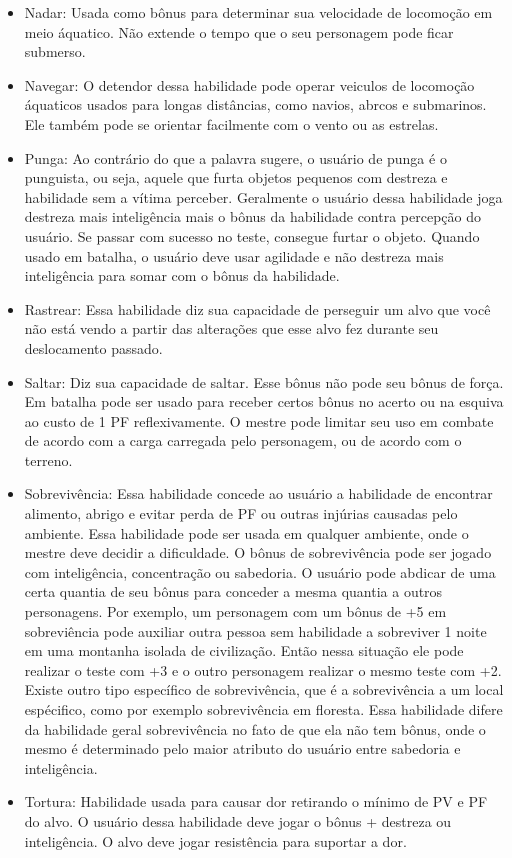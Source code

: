 \begin{itemize}
	\item Nadar: Usada como bônus para determinar sua velocidade de locomoção em meio áquatico. Não extende o tempo que o seu personagem pode ficar submerso.
	
	\item Navegar: O detendor dessa habilidade pode operar veiculos de locomoção áquaticos usados para longas distâncias, como navios, abrcos e submarinos. Ele também pode se orientar facilmente com o vento ou as estrelas.
	
	\item Punga: Ao contrário do que a palavra sugere, o usuário de punga é o punguista, ou seja, aquele que furta objetos pequenos com destreza e habilidade sem a vítima perceber. Geralmente o usuário dessa habilidade joga destreza mais inteligência mais o bônus da habilidade contra percepção do usuário. Se passar com sucesso no teste, consegue furtar o objeto. Quando usado em batalha, o usuário deve usar agilidade e não destreza mais inteligência para somar com o bônus da habilidade.  
	
	\item Rastrear: Essa habilidade diz sua capacidade de perseguir um alvo que você não está vendo a partir das alterações que esse alvo fez durante seu deslocamento passado.
	
	\item Saltar: Diz sua capacidade de saltar. Esse bônus não pode seu bônus de força. Em batalha pode ser usado para receber certos bônus no acerto ou na esquiva ao custo de 1 PF reflexivamente. O mestre pode limitar seu uso em combate de acordo com a carga carregada pelo personagem, ou de acordo com o terreno.
	
	\item Sobrevivência: Essa habilidade concede ao usuário a habilidade de encontrar alimento, abrigo e evitar perda de PF ou outras injúrias causadas pelo ambiente. Essa habilidade pode ser usada em qualquer ambiente, onde o mestre deve decidir a dificuldade. O bônus de sobrevivência pode ser jogado com inteligência, concentração ou sabedoria. O usuário pode abdicar de uma certa quantia de seu bônus para conceder a mesma quantia a outros personagens. Por exemplo, um personagem com um bônus de +5 em sobreviência pode auxiliar outra pessoa sem habilidade a sobreviver 1 noite em uma montanha isolada de civilização. Então nessa situação ele pode realizar o teste com +3 e o outro personagem realizar o mesmo teste com +2. Existe outro tipo específico de sobrevivência, que é a sobrevivência a um local espécifico, como por exemplo sobrevivência em floresta. Essa habilidade difere da habilidade geral sobrevivência no fato de que ela não tem bônus, onde o mesmo é determinado pelo maior atributo do usuário entre sabedoria e inteligência.
	
	\item Tortura: Habilidade usada para causar dor retirando o mínimo de PV e PF do alvo. O usuário dessa habilidade deve jogar o bônus + destreza ou inteligência. O alvo deve jogar resistência para suportar a dor.


\end{itemize}


